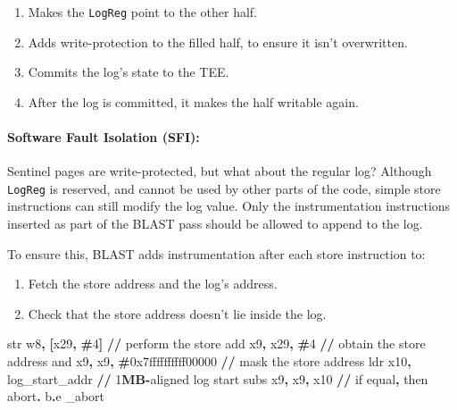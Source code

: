 \documentclass[a4paper, nobind]{templates/ociamthesis}
\providecommand{\tightlist}{%
  \setlength{\itemsep}{0pt}\setlength{\parskip}{0pt}}
\newenvironment{Shaded}{\begin{snugshade}}{\end{snugshade}}
\newcommand{\BaseNTok}[1]{\textcolor[rgb]{0.00,0.00,0.81}{#1}}
\newcommand{\BuiltInTok}[1]{#1}
\newcommand{\DecValTok}[1]{\textcolor[rgb]{0.00,0.00,0.81}{#1}}
\newcommand{\ErrorTok}[1]{\textcolor[rgb]{0.64,0.00,0.00}{\textbf{#1}}}
\newcommand{\NormalTok}[1]{#1}
\newcommand{\OperatorTok}[1]{\textcolor[rgb]{0.81,0.36,0.00}{\textbf{#1}}}
\renewenvironment{Shaded}
{
  \vspace{10pt}%
  \begin{snugshade}%
}{%
  \end{snugshade}%
  \vspace{8pt}%
}
\begin{document}
\begin{enumerate}
\def\labelenumi{\arabic{enumi}.}
\tightlist
\item
  Makes the \texttt{LogReg} point to the other half.
\item
  Adds write-protection to the filled half, to ensure it isn't overwritten.
\item
  Commits the log's state to the TEE.
\item
  After the log is committed, it makes the half writable again.
\end{enumerate}

\paragraph{Software Fault Isolation (SFI):}\label{blastsfi}

Sentinel pages are write-protected, but what about the regular log?
Although \texttt{LogReg} is reserved, and cannot be used by other parts of the code,
simple store instructions can still modify the log value. Only the instrumentation
instructions inserted as part of the BLAST pass should be allowed to append to the log.

To ensure this, BLAST adds instrumentation after each store instruction to:

\begin{enumerate}
\def\labelenumi{\arabic{enumi}.}
\tightlist
\item
  Fetch the store address and the log's address.
\item
  Check that the store address doesn't lie inside the log.
\end{enumerate}

\begin{Shaded}
\begin{Highlighting}[]
\BuiltInTok{str}\NormalTok{ w8}\OperatorTok{,} \OperatorTok{[}\NormalTok{x29}\OperatorTok{,} \OperatorTok{\#}\DecValTok{4}\OperatorTok{]}                 \OperatorTok{//}\NormalTok{ perform the store}
\BuiltInTok{add}\NormalTok{ x9}\OperatorTok{,}\NormalTok{ x29}\OperatorTok{,} \OperatorTok{\#}\DecValTok{4}                   \OperatorTok{//}\NormalTok{ obtain the store address}
\BuiltInTok{and}\NormalTok{ x9}\OperatorTok{,}\NormalTok{ x9}\OperatorTok{,} \OperatorTok{\#}\BaseNTok{0x7ffffffffff00000}   \OperatorTok{//}\NormalTok{ mask the store address}
\NormalTok{ldr x10}\OperatorTok{,}\NormalTok{ log\_start\_addr           }\OperatorTok{//} \DecValTok{1}\ErrorTok{MB}\OperatorTok{{-}}\NormalTok{aligned log start}
\NormalTok{subs x9}\OperatorTok{,}\NormalTok{ x9}\OperatorTok{,}\NormalTok{ x10                  }\OperatorTok{//}\NormalTok{ if equal}\OperatorTok{,}\NormalTok{ then abort}\OperatorTok{.}
\NormalTok{b}\OperatorTok{.}\NormalTok{e \_abort}
\end{Highlighting}
\end{Shaded}
\end{document}
